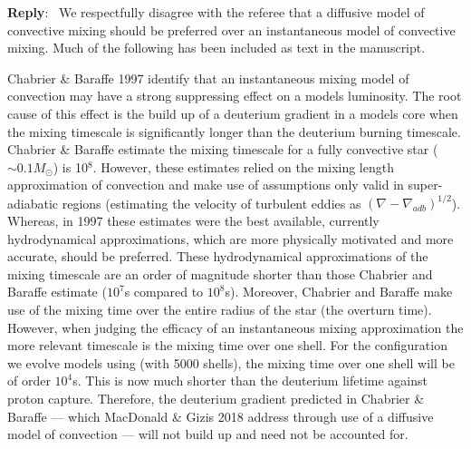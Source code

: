 \documentclass[11pt]{article}
\newcounter{reviewer}
\newcounter{point}[reviewer]
\newenvironment{reply}
   {\medskip \noindent \begin{sf}\textbf{Reply}:\  }
   {\medskip \end{sf}}
\begin{document}
\begin{reply}
	We respectfully disagree with the referee that a diffusive model of
	convective mixing should be preferred over an instantaneous model of
	convective mixing. Much of the following has been included as text in the
	manuscript.


	Chabrier \& Baraffe 1997 identify that an instantaneous mixing model of
	convection may have a strong suppressing effect on a models luminosity. The
	root cause of this effect is the build up of a deuterium gradient in a
	models core when the mixing timescale is significantly longer than the
	deuterium burning timescale. Chabrier \& Baraffe estimate the mixing
	timescale for a fully convective star ($\sim 0.1M_{\odot}$) is 10$^{8}$.
	However, these estimates relied on the mixing length approximation of
	convection and make use of assumptions only valid in super-adiabatic regions
	(estimating the velocity of turbulent eddies as $(\nabla -
	\nabla_{adb})^{1/2}$). Whereas, in 1997 these estimates were the best
	available, currently hydrodynamical approximations, which are more
	physically motivated and more accurate, should be preferred. These
	hydrodynamical approximations of the mixing timescale are an order of
	magnitude shorter than those Chabrier and Baraffe estimate ($10^{7}$s
	compared to $10^{8}$s). Moreover, Chabrier and Baraffe make use of the
	mixing time over the entire radius of the star (the overturn time).
	However, when judging the efficacy of an instantaneous mixing approximation
	the more relevant timescale is the mixing time over one shell. For the
	configuration we evolve models using (with 5000 shells), the mixing time
	over one shell will be of order $10^4$s. This is now much shorter than the
	deuterium lifetime against proton capture. Therefore, the deuterium
	gradient predicted in Chabrier \& Baraffe --- which MacDonald \& Gizis 2018
	address through use of a diffusive model of convection --- will not build up
	and need not be accounted for.


\end{reply}
\end{document}
